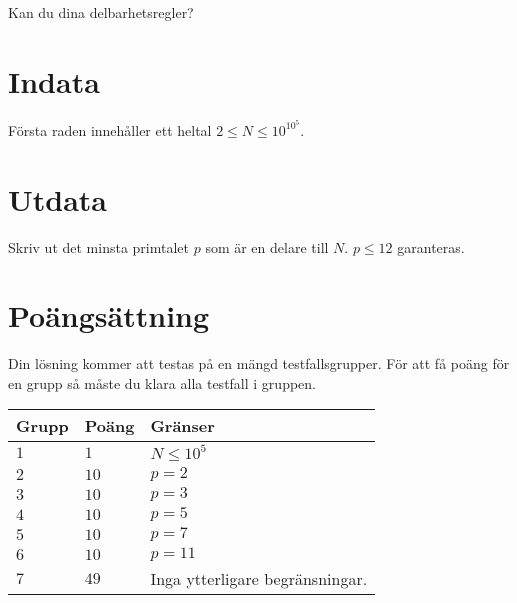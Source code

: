 \noindent
Kan du dina delbarhetsregler?

\noindent
\section*{Indata}
Första raden innehåller ett heltal $2 \leq N \leq 10^{10^5}$. 

\section*{Utdata}
Skriv ut det minsta primtalet $p$ som är en delare till $N$. $p \leq 12$ garanteras.

\section*{Poängsättning}
Din lösning kommer att testas på en mängd testfallsgrupper.
För att få poäng för en grupp så måste du klara alla testfall i gruppen.

\noindent
\begin{tabular}{| l | l | p{12cm} |}
  \hline
  \textbf{Grupp} & \textbf{Poäng} & \textbf{Gränser} \\ \hline
  $1$    & $1$          & $N \leq 10^5$  \\ \hline
  $2$    & $10$         & $p = 2$  \\ \hline
  $3$    & $10$         & $p = 3$  \\ \hline
  $4$    & $10$         & $p = 5$  \\ \hline
  $5$    & $10$         & $p = 7$  \\ \hline
  $6$    & $10$         & $p = 11$  \\ \hline
  $7$    & $49$         & Inga ytterligare begränsningar. \\ \hline
\end{tabular}

